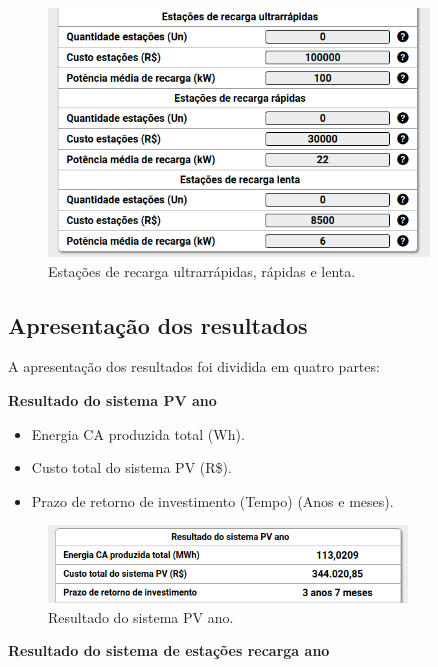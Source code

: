 \begin{figure}[H]
    \centering
    \includegraphics[width=0.9\textwidth]{./Figuras/ret_fin_3.png}
    \caption{Estações de recarga ultrarrápidas, rápidas e lenta.}
   \label{fig:ret_fin_3}
\end{figure}

\newpage

\subsection{Apresentação dos resultados}

A apresentação dos resultados foi dividida em quatro partes:

\textbf{Resultado do sistema PV ano}

\begin{itemize}
   \item Energia CA produzida total (Wh).
   \item Custo total do sistema PV (R\$).
   \item Prazo de retorno de investimento (Tempo) (Anos e meses).
\end{itemize}

\begin{figure}[H]
    \centering
    \includegraphics[width=0.85\textwidth]{./Figuras/Resultados_number_1.png}
    \caption{Resultado do sistema PV ano.}
   \label{fig:Resultados_number_1}
\end{figure}

\textbf{Resultado do sistema de estações recarga ano}

